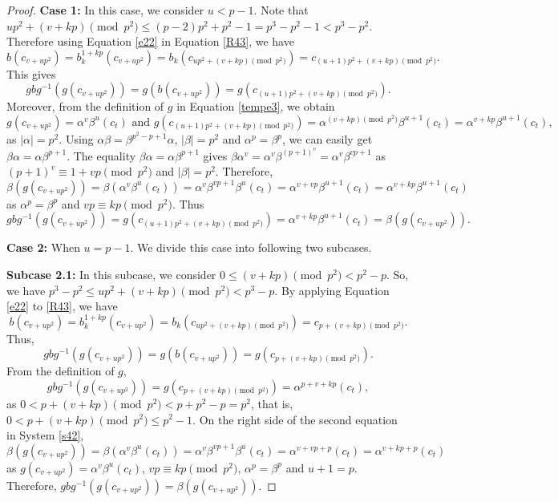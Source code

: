 \documentclass[10pt,a4paper]{amsart}
\begin{document}
\begin{proof}
 \textbf{Case 1:} In this case, we consider $u<p-1$. Note that $up^2+(v+kp)\pmod {p^2} \leq (p-2)p^2+p^2-1=p^3-p^2-1<p^3-p^2.$ Therefore using Equation \eqref{e22} in Equation \eqref{R43}, we have 
 \[
 b(c_{v+up^2})=b_k^{1+kp}(c_{v+up^2})=b_{k}(c_{up^2+(v+kp)\pmod {p^2}})=c_{(u+1)p^2+(v+kp)\pmod {p^2}}.
 \]
 This gives 
  \[
  gbg^{-1}(g(c_{v+up^2})) = g(b(c_{v+up^2}))=g(c_{(u+1)p^2+(v+kp)\pmod {p^2}}).
 \]
Moreover, from the definition of $g$ in Equation \eqref{tempe3}, we obtain
\[
g(c_{v+up^2})=\alpha^{v}\beta^{u}(c_t) \text{ and } g(c_{(u+1)p^2+(v+kp)\pmod {p^2}})=\alpha^{(v+kp)\pmod {p^2}}\beta^{u+1}(c_t)=\alpha^{v+kp}\beta^{u+1}(c_t), 
\]
as $|\alpha|=p^2$.
Using $\alpha \beta=\beta^{p^2-p+1}\alpha$, $|\beta|=p^2$ and $\alpha^p=\beta^p$, we can easily get $\beta \alpha=\alpha \beta^{p+1}$. The equality $\beta \alpha=\alpha \beta^{p+1}$ gives $\beta \alpha^v=\alpha^v\beta^{(p+1)^v}=\alpha^v\beta^{vp+1}$ as $(p+1)^v \equiv 1+vp \pmod {p^2}$ and $|\beta|=p^2$. Therefore,
\begin{equation*}
\beta(g(c_{v+up^2}))=\beta(\alpha^{v}\beta^{u}(c_t)) = \alpha^v \beta^{vp+1}\beta^{u}(c_t)=\alpha^{v+vp}\beta^{u+1}(c_t)=\alpha^{v+kp}\beta^{u+1}(c_t)
\end{equation*}
as $\alpha^p=\beta^p$ and $vp \equiv kp \pmod {p^2}$. Thus
 \[ gbg^{-1}(g(c_{v+up^2}))=g(c_{(u+1)p^2+(v+kp)\pmod {p^2}})=\alpha^{v+kp}\beta^{u+1}(c_t)=\beta(g(c_{v+up^2})).\]

\textbf{Case 2:} When $u=p-1$. We divide this case into following two subcases.

\textbf{Subcase 2.1:} In this subcase, we consider $0 \leq (v+kp)\pmod {p^2}<p^2-p$. So, we have $p^3-p^2 \leq up^2+(v+kp)\pmod {p^2} <p^3-p$. By applying Equation \eqref{e22} to \eqref{R43}, we have 
\[
b(c_{v+up^2})=b_k^{1+kp}(c_{v+up^2})=b_k(c_{up^2+(v+kp)\pmod {p^2}})=c_{p+(v+kp)\pmod {p^2}}.
\]
Thus, 
  \[
  gbg^{-1}(g(c_{v+up^2}))= g(b(c_{v+up^2}))=g(c_{p+(v+kp)\pmod {p^2}}).
 \]
From the definition of $g$,
\[
gbg^{-1}(g(c_{v+up^2}))=g(c_{p+(v+kp)\pmod {p^2}})=\alpha^{p+v+kp}(c_t), 
\]
as $0<p+(v+kp)\pmod {p^2}<p+p^2-p= p^2$, that is, $0<p+(v+kp)\pmod {p^2} \leq p^2-1$.
On the right side of the second equation in System \eqref{s42},
\[
\beta(g(c_{v+up^2}))=\beta(\alpha^{v}\beta^{u}(c_t))= \alpha^v \beta^{vp+1} \beta^{u}(c_t)=\alpha^{v+vp+p}(c_t)=\alpha^{v+kp+p}(c_t)
\]
as $g(c_{v+up^2})=\alpha^{v}\beta^{u}(c_t)$, $vp \equiv kp \pmod {p^2}$, $\alpha^p=\beta^p$ and $u+1=p$. Therefore, $gbg^{-1}(g(c_{v+up^2}))=\beta(g(c_{v+up^2}))$.


\end{proof}
\end{document}

